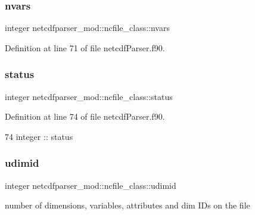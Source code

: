 \subsubsection{\texorpdfstring{nvars}{nvars}}
{\footnotesize\ttfamily integer netcdfparser\+\_\+mod\+::ncfile\+\_\+class\+::nvars\hspace{0.3cm}{\ttfamily [private]}}



Definition at line 71 of file netcdf\+Parser.\+f90.

\mbox{\label{structnetcdfparser__mod_1_1ncfile__class_ad5ca70c79d7fb287890f7c0cda5a222c}} 
\subsubsection{\texorpdfstring{status}{status}}
{\footnotesize\ttfamily integer netcdfparser\+\_\+mod\+::ncfile\+\_\+class\+::status\hspace{0.3cm}{\ttfamily [private]}}



Definition at line 74 of file netcdf\+Parser.\+f90.


\begin{DoxyCode}
74         \textcolor{keywordtype}{integer} :: status
\end{DoxyCode}
\mbox{\label{structnetcdfparser__mod_1_1ncfile__class_a4ecd4e68d99de349ac131df9572b5738}} 
\subsubsection{\texorpdfstring{udimid}{udimid}}
{\footnotesize\ttfamily integer netcdfparser\+\_\+mod\+::ncfile\+\_\+class\+::udimid\hspace{0.3cm}{\ttfamily [private]}}



number of dimensions, variables, attributes and dim I\+Ds on the file 



